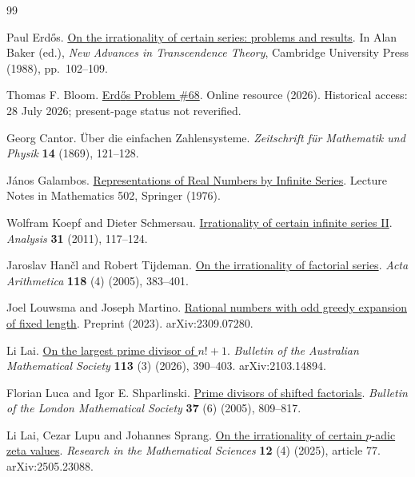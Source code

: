 \documentclass[11pt]{article}
\begin{document}
\begin{thebibliography}{99}

Paul Erd{\H o}s. \href{https://doi.org/10.1017/CBO9780511897184.009}{On the irrationality of certain series: problems and results}.
In Alan Baker (ed.), \emph{New Advances in Transcendence Theory}, Cambridge University Press (1988), pp.~102--109.

Thomas F. Bloom. \href{https://www.erdosproblems.com/68}{Erd{\H o}s Problem {\#68}}.
Online resource (2026). Historical access: 28 July 2026; present-page status not reverified.

Georg Cantor. {\"U}ber die einfachen Zahlensysteme.
\emph{Zeitschrift f{\"u}r Mathematik und Physik} \textbf{14} (1869), 121--128.

J{\'a}nos Galambos. \href{https://doi.org/10.1007/BFb0081642}{Representations of Real Numbers by Infinite Series}.
Lecture Notes in Mathematics 502, Springer (1976).

Wolfram Koepf and Dieter Schmersau. \href{https://doi.org/10.1524/anly.2011.1094}{Irrationality of certain infinite series {II}}.
\emph{Analysis} \textbf{31} (2011), 117--124.

Jaroslav Han{\v c}l and Robert Tijdeman. \href{https://doi.org/10.4064/aa118-4-5}{On the irrationality of factorial series}.
\emph{Acta Arithmetica} \textbf{118} (4) (2005), 383--401.

Joel Louwsma and Joseph Martino. \href{https://arxiv.org/abs/2309.07280v1}{Rational numbers with odd greedy expansion of fixed length}.
Preprint (2023). arXiv:2309.07280.

Li Lai. \href{https://doi.org/10.1017/S0004972725100543}{On the largest prime divisor of {$n!+1$}}.
\emph{Bulletin of the Australian Mathematical Society} \textbf{113} (3) (2026), 390--403. arXiv:2103.14894.

Florian Luca and Igor E. Shparlinski. \href{https://doi.org/10.1112/S0024609305004923}{Prime divisors of shifted factorials}.
\emph{Bulletin of the London Mathematical Society} \textbf{37} (6) (2005), 809--817.

Li Lai, Cezar Lupu and Johannes Sprang. \href{https://doi.org/10.1007/s40687-025-00559-x}{On the irrationality of certain {$p$}-adic zeta values}.
\emph{Research in the Mathematical Sciences} \textbf{12} (4) (2025), article 77. arXiv:2505.23088.


\end{thebibliography}
\end{document}
